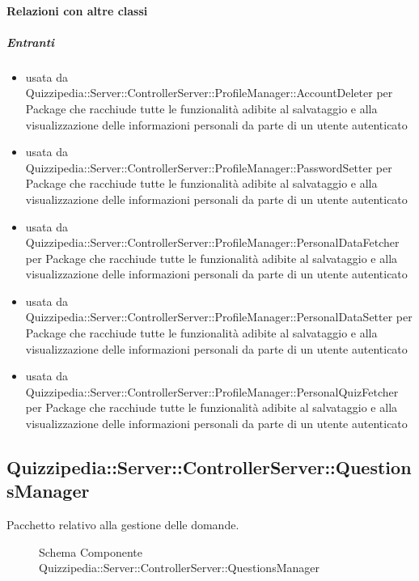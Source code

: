 \paragraph{Relazioni con altre classi}
\subparagraph{Entranti}
\begin{itemize}
\item usata da Quizzipedia::Server::ControllerServer::ProfileManager::AccountDeleter per Package che racchiude tutte le funzionalità adibite al salvataggio e alla visualizzazione delle informazioni personali da parte di un utente autenticato
\item usata da Quizzipedia::Server::ControllerServer::ProfileManager::PasswordSetter per Package che racchiude tutte le funzionalità adibite al salvataggio e alla visualizzazione delle informazioni personali da parte di un utente autenticato
\item usata da Quizzipedia::Server::ControllerServer::ProfileManager::PersonalDataFetcher per Package che racchiude tutte le funzionalità adibite al salvataggio e alla visualizzazione delle informazioni personali da parte di un utente autenticato
\item usata da Quizzipedia::Server::ControllerServer::ProfileManager::PersonalDataSetter per Package che racchiude tutte le funzionalità adibite al salvataggio e alla visualizzazione delle informazioni personali da parte di un utente autenticato
\item usata da Quizzipedia::Server::ControllerServer::ProfileManager::PersonalQuizFetcher per Package che racchiude tutte le funzionalità adibite al salvataggio e alla visualizzazione delle informazioni personali da parte di un utente autenticato
\end{itemize}
\subsection{Quizzipedia::Server::ControllerServer::QuestionsManager}
Pacchetto relativo alla gestione delle domande.
\begin{figure}[H]
\centering
\noindent{}
\caption[Schema Componente Quizzipedia::Server::ControllerServer::QuestionsManager]{Schema Componente Quizzipedia::Server::ControllerServer::QuestionsManager}
\end{figure}
